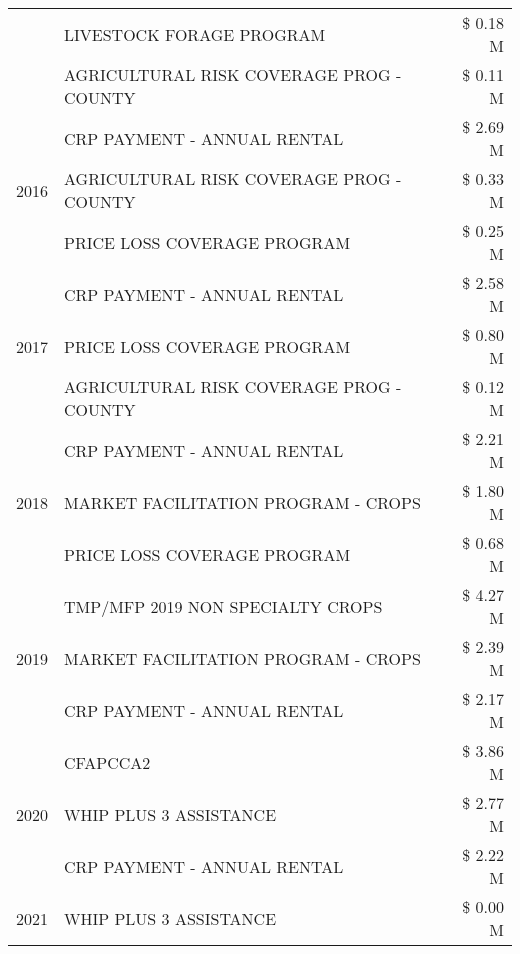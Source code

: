 \begin{tabular}{llr}
 & LIVESTOCK FORAGE PROGRAM & \$ 0.18 M \\
 & AGRICULTURAL RISK COVERAGE PROG - COUNTY & \$ 0.11 M \\
\cline{1-3}
\multirow[t]{3}{*}{2016} & CRP PAYMENT - ANNUAL RENTAL & \$ 2.69 M \\
 & AGRICULTURAL RISK COVERAGE PROG - COUNTY & \$ 0.33 M \\
 & PRICE LOSS COVERAGE PROGRAM & \$ 0.25 M \\
\cline{1-3}
\multirow[t]{3}{*}{2017} & CRP PAYMENT - ANNUAL RENTAL & \$ 2.58 M \\
 & PRICE LOSS COVERAGE PROGRAM & \$ 0.80 M \\
 & AGRICULTURAL RISK COVERAGE PROG - COUNTY & \$ 0.12 M \\
\cline{1-3}
\multirow[t]{3}{*}{2018} & CRP PAYMENT - ANNUAL RENTAL & \$ 2.21 M \\
 & MARKET FACILITATION PROGRAM - CROPS & \$ 1.80 M \\
 & PRICE LOSS COVERAGE PROGRAM & \$ 0.68 M \\
\cline{1-3}
\multirow[t]{3}{*}{2019} & TMP/MFP 2019 NON SPECIALTY CROPS & \$ 4.27 M \\
 & MARKET FACILITATION PROGRAM - CROPS & \$ 2.39 M \\
 & CRP PAYMENT - ANNUAL RENTAL & \$ 2.17 M \\
\cline{1-3}
\multirow[t]{3}{*}{2020} & CFAPCCA2 & \$ 3.86 M \\
 & WHIP PLUS 3 ASSISTANCE & \$ 2.77 M \\
 & CRP PAYMENT - ANNUAL RENTAL & \$ 2.22 M \\
\cline{1-3}
2021 & WHIP PLUS 3 ASSISTANCE & \$ 0.00 M \\
\cline{1-3}
\bottomrule
\end{tabular}
